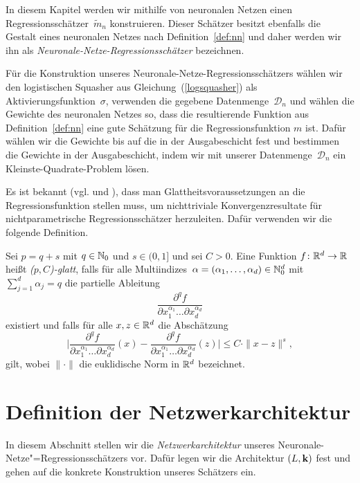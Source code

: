 In diesem Kapitel werden wir mithilfe von neuronalen Netzen einen Regressionsschätzer~$\tilde{m}_n$ konstruieren. Dieser Schätzer besitzt ebenfalls die Gestalt eines neuronalen Netzes nach Definition~\ref{def:nn} und daher werden wir ihn als \emph{Neuronale-Netze-Regressionsschätzer} bezeichnen. 


Für die Konstruktion unseres Neuronale-Netze-Regressionsschätzers wählen wir den logistischen Squasher aus Gleichung~(\ref{logsquasher}) als Aktivierungsfunktion~$\sigma$, verwenden die gegebene Datenmenge~$\mathcal{D}_n$ und wählen die Gewichte des neuronalen Netzes so, dass die resultierende Funktion aus Definition~\ref{def:nn} eine gute Schätzung für die Regressionsfunktion $m$ ist. Dafür wählen wir die Gewichte bis auf die in der Ausgabeschicht fest und bestimmen die Gewichte in der Ausgabeschicht, indem wir mit unserer Datenmenge~$\mathcal{D}_n$ ein Kleinste-Quadrate-Problem lösen.

Es ist bekannt (vgl.\@ \cite[Theorem 7.2 und Problem 7.2]{DevLug96} und \cite[Section 3]{DevWag80}), dass man Glattheitsvoraussetzungen an die Regressionsfunktion stellen muss, um nichttriviale Konvergenzresultate für nichtparametrische Regressionsschätzer herzuleiten. Dafür verwenden wir die folgende Definition.
\begin{defn}[($p,C$)-Glattheit]
\label{def:pc}
   Sei $p = q + s$ mit $q \in \mathbb{N}_0$ und $s \in (0,1]$ und sei $C > 0$. Eine Funktion $f\colon \mathbb{R}^d \to \mathbb{R}$ heißt \emph{($p, C$)-glatt}, falls für alle Multiindizes~$\alpha = (\alpha_1,\dots,\alpha_d) \in \mathbb{N}_0^d$ mit $\sum_{j = 1}^{d}\alpha_j = q$ die partielle Ableitung 
   $$ \frac{\partial^qf}{\partial x_1^{\alpha_1}\dots\partial x_d^{\alpha_d}}$$
   existiert und falls für alle $x, z \in \mathbb{R}^d$ die Abschätzung 
   $$ \bigg|\frac{\partial^qf}{\partial x_1^{\alpha_1}\dots\partial x_d^{\alpha_d}}(x) - \frac{\partial^qf}{\partial x_1^{\alpha_1}\dots\partial x_d^{\alpha_d}}(z) \bigg| \leq C \cdot \|x - z\|^s,$$
   gilt, wobei $\|\cdot\|$ die euklidische Norm in $\mathbb{R}^d$ bezeichnet.  
\end{defn}

\section{Definition der Netzwerkarchitektur}
\label{subsec:2:1}
In diesem Abschnitt stellen wir die \emph{Netzwerkarchitektur} unseres Neuronale-Netze"=Regressionsschätzers vor. Dafür legen wir die Architektur $(L,\mathbf{k})$ fest und gehen auf die konkrete Konstruktion unseres Schätzers ein.


